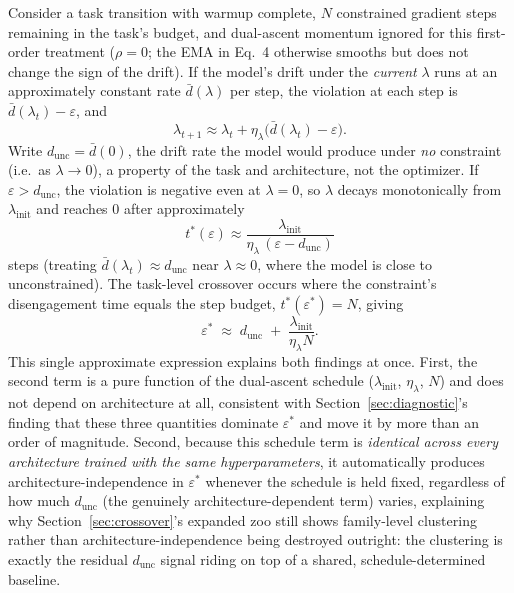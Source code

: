 \documentclass[11pt]{article}
\newcommand{\eps}{\varepsilon}
\newcommand{\epsstar}{\eps^{*}}
\begin{document}
Consider a task transition with warmup complete, $N$ constrained gradient
steps remaining in the task's budget, and dual-ascent momentum ignored for
this first-order treatment ($\rho=0$; the EMA in Eq.~4 otherwise smooths but
does not change the sign of the drift). If the model's drift under the
\emph{current} $\lambda$ runs at an approximately constant rate $\bar d(\lambda)$
per step, the violation at each step is $\bar d(\lambda_t)-\eps$, and
\begin{equation}
\lambda_{t+1} \approx \lambda_t + \eta_\lambda\big(\bar d(\lambda_t)-\eps\big).
\label{eq:lambda_approx}
\end{equation}
Write $d_{\mathrm{unc}} = \bar d(0)$, the drift rate the model would produce
under \emph{no} constraint (i.e.\ as $\lambda\to0$), a property of the
task and architecture, not the optimizer. If $\eps > d_{\mathrm{unc}}$, the
violation is negative even at $\lambda=0$, so $\lambda$ decays monotonically
from $\lambda_{\mathrm{init}}$ and reaches 0 after approximately
\begin{equation}
t^*(\eps) \approx \frac{\lambda_{\mathrm{init}}}{\eta_\lambda\,(\eps - d_{\mathrm{unc}})}
\label{eq:tstar}
\end{equation}
steps (treating $\bar d(\lambda_t)\approx d_{\mathrm{unc}}$ near $\lambda\approx0$,
where the model is close to unconstrained). The task-level crossover occurs
where the constraint's disengagement time equals the step budget,
$t^*(\epsstar)=N$, giving
\begin{equation}
\epsstar \;\approx\; d_{\mathrm{unc}} \;+\; \frac{\lambda_{\mathrm{init}}}{\eta_\lambda N}.
\label{eq:eps_star_approx}
\end{equation}
This single approximate expression explains both findings at once. First,
the second term is a pure function of the dual-ascent schedule
($\lambda_{\mathrm{init}}$, $\eta_\lambda$, $N$) and does not depend on
architecture at all, consistent with Section~\ref{sec:diagnostic}'s
finding that these three quantities dominate $\epsstar$ and move it by more
than an order of magnitude. Second, because this schedule term is
\emph{identical across every architecture trained with the same
hyperparameters}, it automatically produces architecture-independence in
$\epsstar$ whenever the schedule is held fixed, regardless of how much
$d_{\mathrm{unc}}$ (the genuinely architecture-dependent term) varies,
explaining why Section~\ref{sec:crossover}'s expanded zoo still shows
family-level clustering rather than architecture-independence being
destroyed outright: the clustering is exactly the residual $d_{\mathrm{unc}}$
signal riding on top of a shared, schedule-determined baseline.
\end{document}
